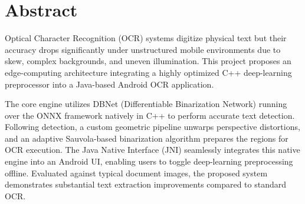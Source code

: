 \chapter*{Abstract}%
%

\par Optical Character Recognition (OCR) systems digitize physical text but their accuracy drops significantly under unstructured mobile environments due to skew, complex backgrounds, and uneven illumination. This project proposes an edge-computing architecture integrating a highly optimized C++ deep-learning preprocessor into a Java-based Android OCR application.
\par The core engine utilizes DBNet (Differentiable Binarization Network) running over the ONNX framework natively in C++ to perform accurate text detection. Following detection, a custom geometric pipeline unwarps perspective distortions, and an adaptive Sauvola-based binarization algorithm prepares the regions for OCR execution. The Java Native Interface (JNI) seamlessly integrates this native engine into an Android UI, enabling users to toggle deep-learning preprocessing offline. Evaluated against typical document images, the proposed system demonstrates substantial text extraction improvements compared to standard OCR.

\thispagestyle{plain}

